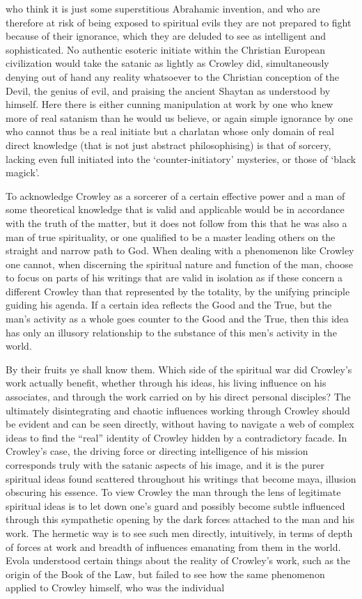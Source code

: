 \begin{footnotesize}
\begin{sffamily}
who think it is just some superstitious Abrahamic invention, and who are therefore at risk of being exposed to spiritual evils they are not prepared to fight because of their ignorance, which they are deluded to see as intelligent and sophisticated. No authentic esoteric initiate within the Christian European civilization would take the satanic as lightly as Crowley did, simultaneously denying out of hand any reality whatsoever to the Christian conception of the Devil, the genius of evil, and praising the ancient Shaytan as understood by himself. Here there is either cunning manipulation at work by one who knew more of real satanism than he would us believe, or again simple ignorance by one who cannot thus be a real initiate but a charlatan whose only domain of real direct knowledge (that is not just abstract philosophising) is that of sorcery, lacking even full initiated into the `counter-initiatory' mysteries, or those of `black magick'.

To acknowledge Crowley as a sorcerer of a certain effective power and a man of some theoretical knowledge that is valid and applicable would be in accordance with the truth of the matter, but it does not follow from this that he was also a man of true spirituality, or one qualified to be a master leading others on the straight and narrow path to God. When dealing with a phenomenon like Crowley one cannot, when discerning the spiritual nature and function of the man, choose to focus on parts of his writings that are valid in isolation as if these concern a different Crowley than that represented by the totality, by the unifying principle guiding his agenda. If a certain idea reflects the Good and the True, but the man's activity as a whole goes counter to the Good and the True, then this idea has only an illusory relationship to the substance of this men's activity in the world.

By their fruits ye shall know them. Which side of the spiritual war did Crowley's work actually benefit, whether through his ideas, his living influence on his associates, and through the work carried on by his direct personal disciples? The ultimately disintegrating and chaotic influences working through Crowley should be evident and can be seen directly, without having to navigate a web of complex ideas to find the ``real'' identity of Crowley hidden by a contradictory facade. In Crowley's case, the driving force or directing intelligence of his mission corresponds truly with the satanic aspects of his image, and it is the purer spiritual ideas found scattered throughout his writings that become maya, illusion obscuring his essence. To view Crowley the man through the lens of legitimate spiritual ideas is to let down one's guard and possibly become subtle influenced through this sympathetic opening by the dark forces attached to the man and his work. The hermetic way is to see such men directly, intuitively, in terms of depth of forces at work and breadth of influences emanating from them in the world. Evola understood certain things about the reality of Crowley's work, such as the origin of the Book of the Law, but failed to see how the same phenomenon applied to Crowley himself, who was the individual


\end{sffamily}
\end{footnotesize}
